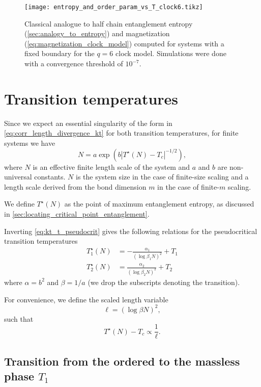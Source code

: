 \begin{figure}
  \texttt{[image: entropy\_and\_order\_param\_vs\_T\_clock6.tikz]}
  \caption{Classical analogue to half chain entanglement entropy (\autoref{sec:analogy_to_entropy}) and magnetization
  (\autoref{eq:magnetization_clock_model}) computed for systems with a fixed boundary for the $q = 6$ clock model.
  Simulations were done with a convergence threshold of $10^{-7}$.}\label{figure:entropy_and_order_param_vs_T_clock5}
\end{figure}

\section{Transition temperatures}

Since we expect an essential singularity of the form in \autoref{eq:corr_length_divergence_kt} for both transition
temperatures, for finite systems we have
\begin{equation}\label{eq:kt_t_pseudocrit}
  N = a \exp \left( b |T^{\star}(N) - T_c|^{-1/2}  \right),
\end{equation}
where $N$ is an effective finite length scale of the system and $a$ and $b$ are non-universal constants.
$N$ is the system size in the case of finite-size scaling and a length scale derived from the bond dimension $m$ in the
case of finite-$m$ scaling.

We define $T^{\star}(N)$ as the point of maximum entanglement entropy, as discussed in
\autoref{sec:locating_critical_point_entanglement}.

Inverting \autoref{eq:kt_t_pseudocrit} gives the following relations for the pseudocritical transition temperatures
\begin{align}
  T^{\star}_{1}(N) &= -\frac{\alpha_1}{(\log \beta_1 N)^2} + T_1 \\
  T^{\star}_{2}(N) &= \frac{\alpha_2}{(\log \beta_2 N)^2} + T_2
\end{align}
where $\alpha = b^2$ and $\beta = 1/a$ (we drop the subscripts denoting the transition).

For convenience, we define the scaled length variable
\begin{equation}
  \ell = (\log \beta N)^2,
\end{equation}
such that
\begin{equation}
  T^{\star}(N) - T_c \propto \frac{1}{\ell}.
\end{equation}

\subsection{Transition from the ordered to the massless phase $T_1$}

